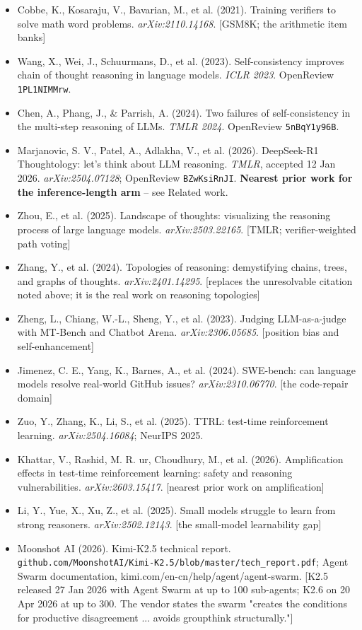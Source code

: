 \documentclass[11pt]{article}
\begin{document}
\begin{itemize}
\item Cobbe, K., Kosaraju, V., Bavarian, M., et al. (2021). Training verifiers to solve math word problems. {\it arXiv:2110.14168}. [GSM8K; the arithmetic item banks]
\item Wang, X., Wei, J., Schuurmans, D., et al. (2023). Self-consistency improves chain of thought reasoning in language models. {\it ICLR 2023}. OpenReview \texttt{1PL1NIMMrw}.
\item Chen, A., Phang, J., \& Parrish, A. (2024). Two failures of self-consistency in the multi-step reasoning of LLMs. {\it TMLR 2024}. OpenReview \texttt{5nBqY1y96B}.
\item Marjanovic, S. V., Patel, A., Adlakha, V., et al. (2026). DeepSeek-R1 Thoughtology: let's think about LLM reasoning. {\it TMLR}, accepted 12 Jan 2026. {\it arXiv:2504.07128}; OpenReview \texttt{BZwKsiRnJI}. {\bf Nearest prior work for the inference-length arm} -- see Related work.
\item Zhou, E., et al. (2025). Landscape of thoughts: visualizing the reasoning process of large language models. {\it arXiv:2503.22165}. [TMLR; verifier-weighted path voting]
\item Zhang, Y., et al. (2024). Topologies of reasoning: demystifying chains, trees, and graphs of thoughts. {\it arXiv:2401.14295}. [replaces the unresolvable citation noted above; it is the real work on reasoning topologies]
\item Zheng, L., Chiang, W.-L., Sheng, Y., et al. (2023). Judging LLM-as-a-judge with MT-Bench and Chatbot Arena. {\it arXiv:2306.05685}. [position bias and self-enhancement]
\item Jimenez, C. E., Yang, K., Barnes, A., et al. (2024). SWE-bench: can language models resolve real-world GitHub issues? {\it arXiv:2310.06770}. [the code-repair domain]
\item Zuo, Y., Zhang, K., Li, S., et al. (2025). TTRL: test-time reinforcement learning. {\it arXiv:2504.16084}; NeurIPS 2025.
\item Khattar, V., Rashid, M. R. ur, Choudhury, M., et al. (2026). Amplification effects in test-time reinforcement learning: safety and reasoning vulnerabilities. {\it arXiv:2603.15417}. [nearest prior work on amplification]
\item Li, Y., Yue, X., Xu, Z., et al. (2025). Small models struggle to learn from strong reasoners. {\it arXiv:2502.12143}. [the small-model learnability gap]
\item Moonshot AI (2026). Kimi-K2.5 technical report. \texttt{github.com/MoonshotAI/Kimi-K2.5/blob/master/tech\_report.pdf}; Agent Swarm documentation, kimi.com/en-cn/help/agent/agent-swarm. [K2.5 released 27 Jan 2026 with Agent Swarm at up to 100 sub-agents; K2.6 on 20 Apr 2026 at up to 300. The vendor states the swarm "creates the conditions for productive disagreement ... avoids groupthink structurally."]

\end{itemize}
\end{document}
